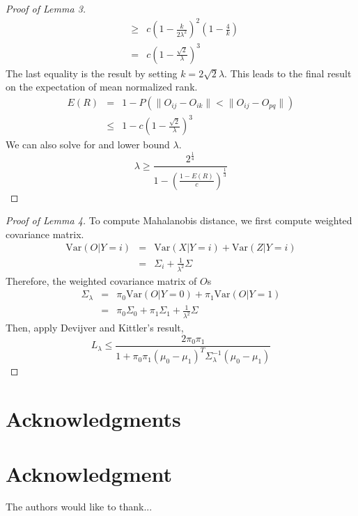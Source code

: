 \documentclass[11pt,journal,compsoc]{IEEEtran}
\begin{document}
\begin{proof}[Proof of Lemma 3]
\begin{eqnarray*}
&\geq& c(1-\frac{k}{2\lambda^2})^2(1-\frac{4}{k}) \\
&=&c(1-\frac{\sqrt{2}}{\lambda})^3
\end{eqnarray*}
The last equality is the result by setting $k=2\sqrt{2}\lambda$. This leads to the final result on the expectation of mean normalized rank.
\begin{eqnarray*}
E(R)&=&1-P(\|O_{ij}-O_{ik}\| < \|O_{ij}-O_{pq}\|) \\
&\leq& 1-c(1-\frac{\sqrt{2}}{\lambda})^3
\end{eqnarray*}
We can also solve for and lower bound $\lambda$.
\[\lambda \geq \frac{2^{\frac{1}{4}}}{1-(\frac{1-E(R)}{c})^{\frac{1}{3}}} \]
\end{proof}


\begin{proof}[Proof of Lemma 4]
To compute Mahalanobis distance, we first compute weighted covariance matrix.
\begin{eqnarray*}
\text{Var}(O|Y=i) &=& \text{Var}(X|Y=i)+\text{Var}(Z|Y=i) \\
&=& \Sigma_i+\frac{1}{\lambda^2}\Sigma
\end{eqnarray*}
Therefore, the weighted covariance matrix of $O$s
\begin{eqnarray*}
\Sigma_\lambda&=&\pi_0\text{Var}(O|Y=0)+\pi_1\text{Var}(O|Y=1) \\
&=&\pi_0\Sigma_0+\pi_1\Sigma_1+\frac{1}{\lambda^2}\Sigma
\end{eqnarray*}
Then, apply Devijver and Kittler's result,
\[L_\lambda \leq \frac{2\pi_0\pi_1}{1+\pi_0\pi_1(\mu_0-\mu_1)^T\Sigma_\lambda^{-1}(\mu_0-\mu_1)}\]
\end{proof}



\ifCLASSOPTIONcompsoc
  \section*{Acknowledgments}
\else
  \section*{Acknowledgment}
\fi


The authors would like to thank...


\ifCLASSOPTIONcaptionsoff
  \newpage
\fi
\end{document}
